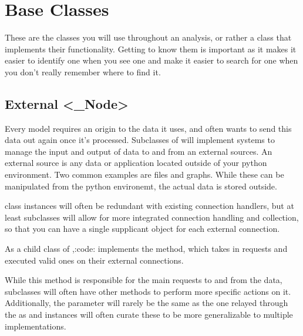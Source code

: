 \documentclass[letterpaper,10pt,english]{sphinxmanual}
\begin{document}
\section{Base Classes}
\label{\detokenize{beginners-guide:base-classes}}
These are the classes you will use throughout an analysis, or rather a class that implements their functionality. Getting to know them is important as it makes it easier to identify one when you see one and make it easier to search for one when you don’t really remember where to find it.


\subsection{External \textless{}\_Node\textgreater{}}
\label{\detokenize{beginners-guide:external-node}}\label{\detokenize{beginners-guide:external}}

Every model requires an origin to the data it uses, and often wants to send this data out again once it’s processed. Subclasses of  will implement systems to manage the input and output of data to and from an external sources. An external source is any data or application located outside of your python environment. Two common examples are files and graphs. While these can be manipulated from the python environemt, the actual data is stored outside.

 class instances will often be redundant with existing connection handlers, but at least subclasses will allow for more integrated connection handling and collection, so that you can have a single supplicant object for each external connection.

As a child class of ,:code: implements the  method, which takes in requests and executed valid ones on their external connections.

While this method is responsible for the main requests to and from the data, subclasses will often have other methods to perform more specific actions on it. Additionally, the  parameter will rarely be the same as the one relayed through the  as   and  instances will often curate these to be more generalizable to multiple  implementations.
\end{document}
